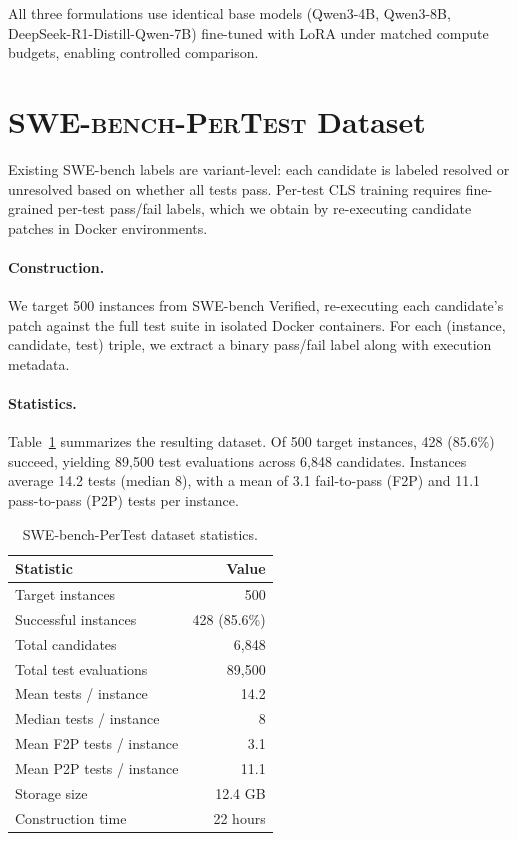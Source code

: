 \documentclass[11pt,a4paper]{article}
\begin{document}
All three formulations use identical base models (Qwen3-4B, Qwen3-8B, DeepSeek-R1-Distill-Qwen-7B) fine-tuned with LoRA under matched compute budgets, enabling controlled comparison.

\section{\textsc{SWE-bench-PerTest} Dataset}
\label{sec:dataset}

Existing SWE-bench labels are variant-level: each candidate is labeled resolved or unresolved based on whether all tests pass.
Per-test CLS training requires fine-grained per-test pass/fail labels, which we obtain by re-executing candidate patches in Docker environments.

\paragraph{Construction.}
We target 500 instances from SWE-bench Verified, re-executing each candidate's patch against the full test suite in isolated Docker containers.
For each (instance, candidate, test) triple, we extract a binary pass/fail label along with execution metadata.

\paragraph{Statistics.}
Table~\ref{tab:dataset-stats} summarizes the resulting dataset.
Of 500 target instances, 428 (85.6\%) succeed, yielding 89,500 test evaluations across 6,848 candidates.
Instances average 14.2 tests (median 8), with a mean of 3.1 fail-to-pass (F2P) and 11.1 pass-to-pass (P2P) tests per instance.

\begin{table}[t]
\centering
\small
\begin{tabular}{lr}
\toprule
\textbf{Statistic} & \textbf{Value} \\
\midrule
Target instances & 500 \\
Successful instances & 428 (85.6\%) \\
Total candidates & 6,848 \\
Total test evaluations & 89,500 \\
Mean tests / instance & 14.2 \\
Median tests / instance & 8 \\
Mean F2P tests / instance & 3.1 \\
Mean P2P tests / instance & 11.1 \\
Storage size & 12.4 GB \\
Construction time & 22 hours \\
\bottomrule
\end{tabular}
\caption{SWE-bench-PerTest dataset statistics.}
\label{tab:dataset-stats}
\end{table}
\end{document}
